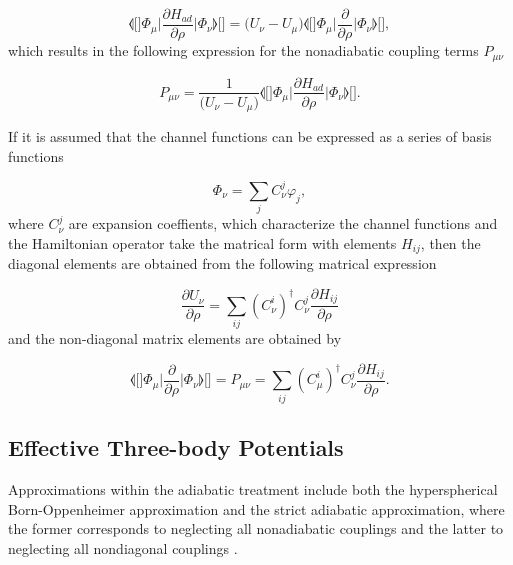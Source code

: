 \begin{equation}\label{derivaham}
\llangle[\bigg]  \Phi_{\mu}\bigg\lvert \frac{\partial H_{ad}}{\partial \rho} \bigg\rvert \Phi_{\nu} \rrangle[\bigg]= \big(U_{\nu}-U_{\mu}\big) \llangle[\bigg]  \Phi_{\mu} \bigg\lvert \frac{\partial}{\partial \rho} \bigg\rvert \Phi_{\nu} \rrangle[\bigg],
\end{equation}
which results in the following expression for the nonadiabatic coupling terms $P_{\mu \nu}$

\begin{equation}
P_{\mu \nu} = \frac{1}{\big(U_{\nu}-U_{\mu}\big)}\llangle[\bigg]  \Phi_{\mu} \bigg\lvert \frac{\partial H_{ad}}{\partial \rho} \bigg\rvert \Phi_{\nu}\rrangle[\bigg].
\end{equation}

If it is assumed that the channel functions can be expressed as a series of basis functions

\begin{equation}
\Phi_{\nu} = \sum_{j}C_{\nu}^j \varphi_j,
\end{equation} 
where $C_{\nu}^{j}$ are expansion coeffients, which characterize the channel functions and the Hamiltonian operator take the matrical form with elements $H_{ij}$, then the diagonal elements are obtained from the following matrical expression \cite{Sanz-Sanz}

\begin{equation}
\frac{\partial U_{\nu}}{\partial \rho} = \sum_{ij}(C_{\nu}^i)^{\dagger}C_{\nu}^j \frac{\partial H_{ij}}{\partial \rho}
\end{equation}
and the non-diagonal matrix elements are obtained by 

\begin{equation}
\llangle[\bigg]  \Phi_{\mu} \bigg\lvert \frac{\partial}{\partial \rho} \bigg\rvert \Phi_{\nu} \rrangle[\bigg] = P_{\mu \nu} = \sum_{ij}(C_{\mu}^i)^{\dagger}C_{\nu}^j \frac{\partial H_{ij}}{\partial \rho}.
\end{equation}


\subsection{Effective Three-body Potentials}\label{sec:Effective_3B}
Approximations within the adiabatic treatment include both the hyperspherical Born-Oppenheimer approximation and the strict adiabatic approximation, where the former corresponds to neglecting all nonadiabatic couplings and the latter to neglecting all nondiagonal couplings \cite{Blume2002}. 

